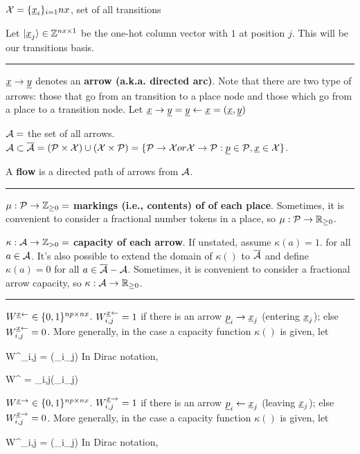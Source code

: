 $\calx = \{\rvx_i\}_{i=1}{nx}$, set of all transitions

Let $\ket{\rvx_j}\in \ZZ^{nx\times 1}$ be the one-hot 
column vector with
$1$ at position $j$. This will be our {transitions basis}.

\hrule

$\rvx\rarrow \rvy$ denotes an {\bf arrow (a.k.a. directed arc)}. Note that there are two type of arrows:
those that go from an transition to a place node and those which go from a place to
a transition node. Let $\rvx\rarrow\rvy=\rvy\larrow \rvx = (\rvx,\rvy)$

${\cal A} =$  the set of all arrows. $\cala \subset \ol {\cala} = (\calp \times \calx) \cup (\calx \times \calp) = \{\calp\rarrow\calx or \calx \rarrow \calp:
\rvp\in\calp, \rvx \in \calx\}$.


A {\bf flow} is a directed path of arrows from ${\cal A}$.

\hrule
$\mu : {\cal P} \rightarrow {\mathbb{Z}}_{\geq 0}=$ {\bf markings (i.e., contents) of of each place}. Sometimes, it is convenient to consider a fractional number tokens in a place, so
$\mu : {\cal P} \rightarrow { \mathbb{R}}_{\geq 0}$.



$\kappa : {\cal A}\rightarrow {\mathbb{Z}}_{>0}=$ {\bf capacity of each arrow}. If unstated, assume $\kappa(a) = 1$.
for all $a\in{\cal A}$. It's also possible to extend the domain of 
$\kappa()$ to $\overline{{\cal A}}$ and define $\kappa(a) = 0$
for all $a\in \overline{{\cal A}}-{\cal A}$. Sometimes, it is convenient to consider a fractional arrow capacity, so
$\kappa : {\cal A} \rightarrow { \mathbb{R}}_{\geq 0}$.

\hrule
$W^{\rvx \larrow} \in \bool^{np\times nx}$. 
$W^{\rvx \larrow}_{i,j} = 1$ if there is an arrow $\rvp_i\rarrow\rvx_j$
(entering $\rvx_j$);
else $W^{\rvx \larrow}_{i,j} = 0$. More generally, in the case a capacity function $\kappa()$ is given, let

\beq
W^{\rvx \larrow}_{i,j} = \kappa(\rvp_i\rarrow \rvx_j)
\eeq
In Dirac notation, 

\beq
W^{\rvx \larrow} = \sum_{i,j}\kappa(\rvp_i\rarrow \rvx_j)
\eeq


$W^{\rvx \rarrow} \in \bool^{np\times nx}$. 
$W^{\rvx \rarrow}_{i,j} = 1$ if there is an arrow $\rvp_i\larrow\rvx_j$
(leaving $\rvx_j$);
else $W^{\rvx \rarrow}_{i,j} = 0$. More generally, in the case a capacity function $\kappa()$ is given, let

\beq
W^{\rvx \rarrow}_{i,j} = \kappa(\rvp_i\larrow \rvx_j)
\eeq
In Dirac notation, 

